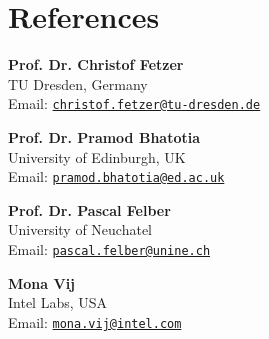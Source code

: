 \documentclass[letterpaper]{article}
\renewenvironment{itemize}{
  \begin{list}{}{
    \setlength{\leftmargin}{1.5em}
  }
}{
  \end{list}
}
\begin{document}
\section*{References}

\begin{itemize}

\item {\bf Prof. Dr. Christof Fetzer }  \\
TU Dresden, Germany\\
Email: \href{mailto:christof.fetzer@tu-dresden.de}{\tt christof.fetzer@tu-dresden.de}
      
\item {\bf  Prof. Dr. Pramod Bhatotia }  \\
University of Edinburgh, UK\\
Email: \href{mailto:pramod.bhatotia@ed.ac.uk}{\tt pramod.bhatotia@ed.ac.uk}

\item {\bf Prof. Dr. Pascal Felber} \\
University of Neuchatel\\
Email: \href{mailto:pascal.felber@unine.ch}{\tt pascal.felber@unine.ch}

\item {\bf Mona Vij }  \\
Intel Labs, USA\\
Email: \href{mailto:mona.vij@intel.com}{\tt mona.vij@intel.com}

\end{itemize}
\end{document}
